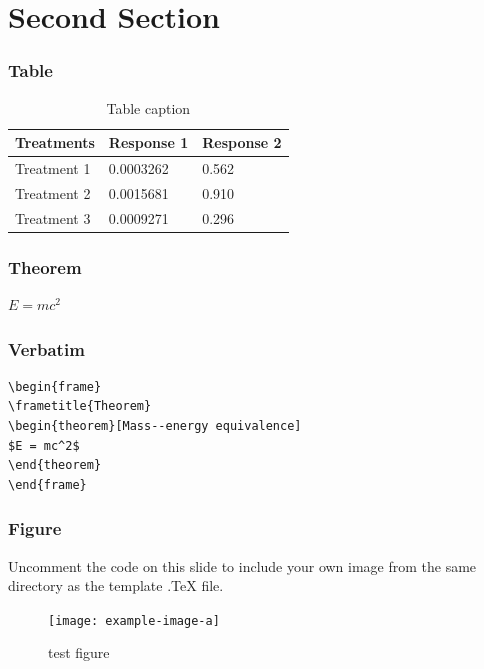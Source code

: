 \documentclass{beamer}
\begin{document}
\section{Second Section}

\begin{frame}
\frametitle{Table}
\begin{table}
\begin{tabular}{l l l}
\toprule
\textbf{Treatments} & \textbf{Response 1} & \textbf{Response 2}\\
\midrule
Treatment 1 & 0.0003262 & 0.562 \\
Treatment 2 & 0.0015681 & 0.910 \\
Treatment 3 & 0.0009271 & 0.296 \\
\bottomrule
\end{tabular}
\caption{Table caption}
\end{table}
\end{frame}


\begin{frame}
\frametitle{Theorem}
\begin{theorem}
$E = mc^2$
\end{theorem}
\end{frame}


\begin{frame}[fragile] %
\frametitle{Verbatim}
\begin{example}
\begin{verbatim}
\begin{frame}
\frametitle{Theorem}
\begin{theorem}[Mass--energy equivalence]
$E = mc^2$
\end{theorem}
\end{frame}\end{verbatim}
\end{example}
\end{frame}


\begin{frame}
\frametitle{Figure}
Uncomment the code on this slide to include your own image from the same directory as the template .TeX file.
\begin{figure}
\texttt{[image: example-image-a]}
\caption{test figure}
\end{figure}
\end{frame}
\end{document}
